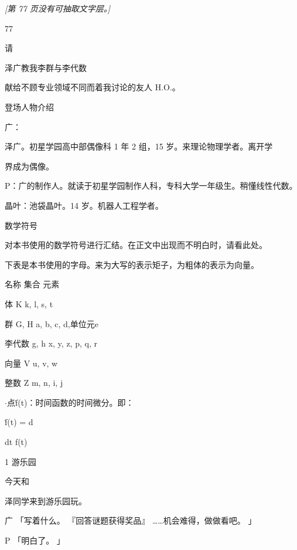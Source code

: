 \noindent\textit{[第 77 页没有可抽取文字层。]}\par

77\par
请\par
泽广教我李群与李代数\par
献给不顾专业领域不同而着我讨论的友人 H.O.。\par
登场人物介绍\par
广：\par
泽广。初星学园高中部偶像科 1 年 2 组，15 岁。来理论物理学者。离开学\par
界成为偶像。\par
P：广的制作人。就读于初星学园制作人科，专科大学一年级生。稍懂线性代数。\par
晶叶：池袋晶叶。14 岁。机器人工程学者。\par
数学符号\par
对本书使用的数学符号进行汇结。在正文中出现而不明白时，请看此处。\par
下表是本书使用的字母。来为大写的表示矩子，为粗体的表示为向量。\par
名称 集合 元素\par
体 K  k, l, s, t\par
群 G, H  a, b, c, d,单位元e\par
李代数 g, h  x, y, z, p, q, r\par
向量 V  u, v, w\par
整数 Z  m, n, i, j\par
$\cdot$点ḟ(t)：时间函数的时间微分。即：\par
ḟ(t) = d\par
dt f(t)\par
1 游乐园\par
今天和\par
泽同学来到游乐园玩。\par
广 「写着什么。 『回答谜题获得奖品』 ……机会难得，做做看吧。 」\par
P 「明白了。 」\par


